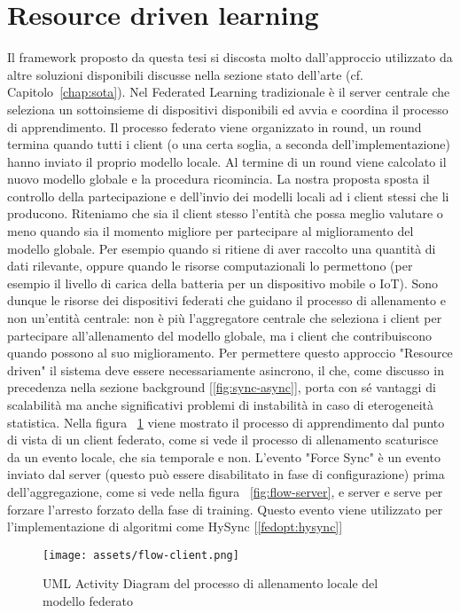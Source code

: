 \documentclass[a4paper, oneside, openright]{report}
\let\oldsection\section
\renewcommand{\section}{\newpage\oldsection}
\begin{document}
\newpage
\section{Resource driven learning}
Il framework proposto da questa tesi si discosta molto dall'approccio utilizzato da altre soluzioni disponibili discusse nella sezione stato dell'arte (cf. Capitolo~\ref{chap:sota}). Nel Federated Learning tradizionale è il server centrale che seleziona un sottoinsieme di dispositivi disponibili ed avvia e coordina il processo di apprendimento. Il processo federato viene organizzato in round, un round termina quando tutti i client (o una certa soglia, a seconda dell'implementazione) hanno inviato il proprio modello locale. Al termine di un round viene calcolato il nuovo modello globale e la procedura ricomincia. La nostra proposta sposta il controllo della partecipazione e dell'invio dei modelli locali ad i client stessi che li producono. Riteniamo che sia il client stesso l'entità che possa meglio valutare o meno quando sia il momento migliore per partecipare al miglioramento del modello globale. Per esempio quando si ritiene di aver raccolto una quantità di dati rilevante, oppure quando le risorse computazionali lo permettono (per esempio il livello di carica della batteria per un dispositivo mobile o IoT). Sono dunque le risorse dei dispositivi federati che guidano il processo di allenamento e non un'entità centrale: non è più l'aggregatore centrale che seleziona i client per partecipare all'allenamento del modello globale, ma i client che contribuiscono quando possono al suo miglioramento. 
Per permettere questo approccio "Resource driven" il sistema deve essere necessariamente asincrono, il che, come discusso in precedenza nella sezione background [\ref{fig:sync-async}], porta con sé vantaggi di scalabilità ma anche significativi problemi di instabilità in caso di eterogeneità statistica. Nella figura ~\ref{fig:flow-client} viene mostrato il processo di apprendimento dal punto di vista di un client federato, come si vede il processo di allenamento scaturisce da un evento locale, che sia temporale e non. L'evento "Force Sync" è un evento inviato dal server (questo può essere disabilitato in fase di configurazione) prima dell'aggregazione, come si vede nella figura ~\ref{fig:flow-server}, e server e serve per forzare l'arresto forzato della fase di training. Questo evento viene utilizzato per l'implementazione di algoritmi come HySync [\ref{fedopt:hysync}]

\begin{figure}[h] \label{fig:flow-client}
\centering
\texttt{[image: assets/flow-client.png]}
\caption{UML Activity Diagram del processo di allenamento locale del modello federato}\label{fig:flow-client}
\end{figure}
\end{document}
